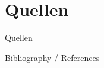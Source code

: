 %
%
%
%

\section{Quellen}


\begin{frame}[allowframebreaks]{Quellen}
 
  
Bibliography / References
  \nocite{*}

  {\tiny 
%  
    \printbibliography %
  }

\end{frame}